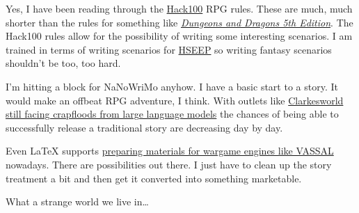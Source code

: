 Yes, I have been reading through the
\href{https://web.archive.org/web/20230515062254/https://hack100rpg.com/wp-content/uploads/2023/04/Hack100_Rulebook_Release1_03.pdf}{Hack100}
RPG rules. These are much, much shorter than the rules for something
like
\href{https://web.archive.org/web/20231102214911/https://dnd.wizards.com/}{\emph{Dungeons
and Dragons 5th Edition}}. The Hack100 rules allow for the possibility
of writing some interesting scenarios. I am trained in terms of writing
scenarios for
\href{https://web.archive.org/web/20230524085912/https://preptoolkit.fema.gov/web/hseep-resources}{HSEEP}
so writing fantasy scenarios shouldn't be too, too hard.

I'm hitting a block for NaNoWriMo anyhow. I have a basic start to a
story. It would make an offbeat RPG adventure, I think. With outlets
like
\href{https://web.archive.org/web/20231003093522/https://neil-clarke.com/it-continues/}{Clarkesworld
still facing crapfloods from large language models} the chances of being
able to successfully release a traditional story are decreasing day by
day.

Even LaTeX supports \href{https://ctan.org/pkg/wargame}{preparing
materials for wargame engines like VASSAL} nowadays. There are
possibilities out there. I just have to clean up the story treatment a
bit and then get it converted into something marketable.

What a strange world we live in\ldots{}
